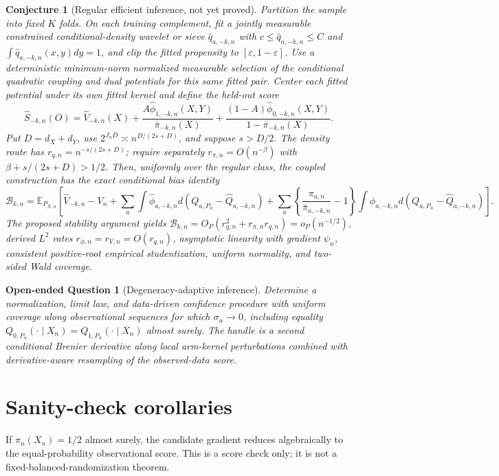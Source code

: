 \documentclass[11pt]{article}
\newcommand{\E}{\mathbb{E}}
\newtheorem{conjecture}{Conjecture}
\newtheorem{question}{Open-ended Question}
\begin{document}
\begin{conjecture}[Regular efficient inference, not yet proved]\label{conj:regular-efficient-inference}
Partition the sample into fixed \(K\) folds. On each training complement, fit a jointly measurable constrained conditional-density wavelet or sieve \(\widehat q_{a,-k,n}\) with \(c\leq\widehat q_{a,-k,n}\leq C\) and \(\int\widehat q_{a,-k,n}(x,y)dy=1\), and clip the fitted propensity to \([\varepsilon,1-\varepsilon]\). Use a deterministic minimum-norm normalized measurable selection of the conditional quadratic coupling and dual potentials for this same fitted pair. Center each fitted potential under its own fitted kernel and define the held-out score
\[
 \widehat S_{-k,n}(O)=\widehat V_{-k,n}(X)+\frac{A\widehat\phi_{1,-k,n}(X,Y)}{\bar\pi_{-k,n}(X)}+\frac{(1-A)\widehat\phi_{0,-k,n}(X,Y)}{1-\bar\pi_{-k,n}(X)}.
\]
Put \(D=d_X+d_Y\), use \(2^{J_nD}\asymp n^{D/(2s+D)}\), and suppose \(s>D/2\). The density route has \(r_{q,n}=n^{-s/(2s+D)}\); require separately \(r_{\pi,n}=O(n^{-\beta})\) with \(\beta+s/(2s+D)>1/2\). Then, uniformly over the regular class, the coupled construction has the exact conditional bias identity
\[
 \mathcal B_{k,n}=\E_{P_{X,n}}\!\left[\widehat V_{-k,n}-V_n+\sum_a\int\widehat\phi_{a,-k,n}d(Q_{a,P_n}-\widehat Q_{a,-k,n})+\sum_a\left\{\frac{\pi_{a,n}}{\bar\pi_{a,-k,n}}-1\right\}\int\widehat\phi_{a,-k,n}d(Q_{a,P_n}-\widehat Q_{a,-k,n})\right].
\]
The proposed stability argument yields \(\mathcal B_{k,n}=O_P(r_{q,n}^2+r_{\pi,n}r_{q,n})=o_P(n^{-1/2})\), derived \(L^2\) rates \(r_{\phi,n}=r_{V,n}=O(r_{q,n})\), asymptotic linearity with gradient \(\psi_n\), consistent positive-root empirical studentization, uniform normality, and two-sided Wald coverage.
\end{conjecture}

\begin{question}[Degeneracy-adaptive inference]\label{oeq:degeneracy-adaptive-inference}
Determine a normalization, limit law, and data-driven confidence procedure with uniform coverage along observational sequences for which \(\sigma_n\to0\), including equality \(Q_{0,P_n}(\cdot\mid X_n)=Q_{1,P_n}(\cdot\mid X_n)\) almost surely. The handle is a second conditional Brenier derivative along local arm-kernel perturbations combined with derivative-aware resampling of the observed-data score.
\end{question}

\section{Sanity-check corollaries}
If \(\pi_n(X_n)=1/2\) almost surely, the candidate gradient reduces algebraically to the equal-probability observational score. This is a score check only; it is not a fixed-balanced-randomization theorem.
\end{document}
